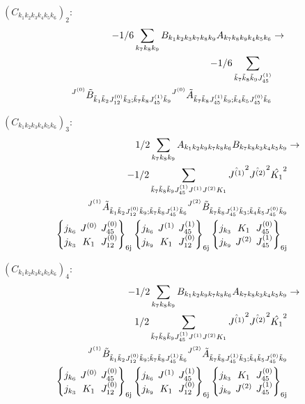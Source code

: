\documentclass[11pt]{article}
\newcommand{\sixj}[6]{\begingroup\setlength{\arraycolsep}{0.2em}\begin{Bmatrix} #1 & #2 & #3 \\ #4 & #5 & #6 \end{Bmatrix}_{\text{6j}}\endgroup}
\begin{document}
$\left({C}_{{k}_{1}{k}_{2}{k}_{3}{k}_{4}{k}_{5}{k}_{6}}\right)_{2}$:
\begin{align}
-1/6\sum_{{k}_{7}{k}_{8}{k}_{9}}{B}_{{k}_{1}{k}_{2}{k}_{3}{k}_{7}{k}_{8}{k}_{9}}{A}_{{k}_{7}{k}_{8}{k}_{9}{k}_{4}{k}_{5}{k}_{6}}&\rightarrow \notag \\-1/6\sum_{\tilde{k}_{7}\tilde{k}_{8}\tilde{k}_{9}J^{(1)}_{45}}& \notag \\{}^{J^{(0)}}\tilde{B}_{\tilde{k}_{1}\tilde{k}_{2}J^{(0)}_{12}\tilde{k}_{3};\tilde{k}_{7}\tilde{k}_{8}J^{(1)}_{45}\tilde{k}_{9}}{}^{J^{(0)}}\tilde{A}_{\tilde{k}_{7}\tilde{k}_{8}J^{(1)}_{45}\tilde{k}_{9};\tilde{k}_{4}\tilde{k}_{5}J^{(0)}_{45}\tilde{k}_{6}}& \notag \\
\end{align}

$\left({C}_{{k}_{1}{k}_{2}{k}_{3}{k}_{4}{k}_{5}{k}_{6}}\right)_{3}$:
\begin{align}
1/2\sum_{{k}_{7}{k}_{8}{k}_{9}}{A}_{{k}_{1}{k}_{2}{k}_{9}{k}_{7}{k}_{8}{k}_{6}}{B}_{{k}_{7}{k}_{8}{k}_{3}{k}_{4}{k}_{5}{k}_{9}}&\rightarrow \notag \\-1/2\sum_{\tilde{k}_{7}\tilde{k}_{8}\tilde{k}_{9}J^{(1)}_{45}J^{(1)}J^{(2)}K_{1}}\hat{J^{(1)}}^{2}\hat{J^{(2)}}^{2}\hat{K_{1}}^{2}& \notag \\{}^{J^{(1)}}\tilde{A}_{\tilde{k}_{1}\tilde{k}_{2}J^{(0)}_{12}\tilde{k}_{9};\tilde{k}_{7}\tilde{k}_{8}J^{(1)}_{45}\tilde{k}_{6}}{}^{J^{(2)}}\tilde{B}_{\tilde{k}_{7}\tilde{k}_{8}J^{(1)}_{45}\tilde{k}_{3};\tilde{k}_{4}\tilde{k}_{5}J^{(0)}_{45}\tilde{k}_{9}}& \notag \\\sixj{j_{{k}_{6}}}{J^{(0)}}{J^{(0)}_{45}}{j_{{k}_{3}}}{K_{1}}{J^{(0)}_{12}}\sixj{j_{{k}_{6}}}{J^{(1)}}{J^{(1)}_{45}}{j_{{k}_{9}}}{K_{1}}{J^{(0)}_{12}}\sixj{j_{{k}_{3}}}{K_{1}}{J^{(0)}_{45}}{j_{{k}_{9}}}{J^{(2)}}{J^{(1)}_{45}}
\end{align}

$\left({C}_{{k}_{1}{k}_{2}{k}_{3}{k}_{4}{k}_{5}{k}_{6}}\right)_{4}$:
\begin{align}
-1/2\sum_{{k}_{7}{k}_{8}{k}_{9}}{B}_{{k}_{1}{k}_{2}{k}_{9}{k}_{7}{k}_{8}{k}_{6}}{A}_{{k}_{7}{k}_{8}{k}_{3}{k}_{4}{k}_{5}{k}_{9}}&\rightarrow \notag \\1/2\sum_{\tilde{k}_{7}\tilde{k}_{8}\tilde{k}_{9}J^{(1)}_{45}J^{(1)}J^{(2)}K_{1}}\hat{J^{(1)}}^{2}\hat{J^{(2)}}^{2}\hat{K_{1}}^{2}& \notag \\{}^{J^{(1)}}\tilde{B}_{\tilde{k}_{1}\tilde{k}_{2}J^{(0)}_{12}\tilde{k}_{9};\tilde{k}_{7}\tilde{k}_{8}J^{(1)}_{45}\tilde{k}_{6}}{}^{J^{(2)}}\tilde{A}_{\tilde{k}_{7}\tilde{k}_{8}J^{(1)}_{45}\tilde{k}_{3};\tilde{k}_{4}\tilde{k}_{5}J^{(0)}_{45}\tilde{k}_{9}}& \notag \\\sixj{j_{{k}_{6}}}{J^{(0)}}{J^{(0)}_{45}}{j_{{k}_{3}}}{K_{1}}{J^{(0)}_{12}}\sixj{j_{{k}_{6}}}{J^{(1)}}{J^{(1)}_{45}}{j_{{k}_{9}}}{K_{1}}{J^{(0)}_{12}}\sixj{j_{{k}_{3}}}{K_{1}}{J^{(0)}_{45}}{j_{{k}_{9}}}{J^{(2)}}{J^{(1)}_{45}}
\end{align}
\end{document}

